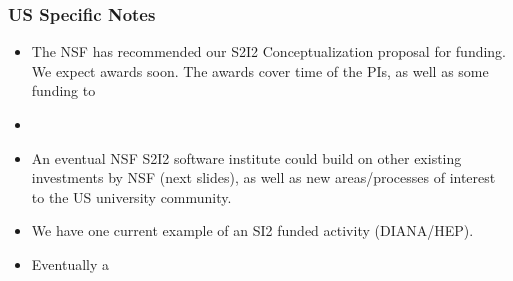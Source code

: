 \begin{frame}
\frametitle{US Specific Notes}

\begin{itemize}
\item The NSF has recommended our S2I2 Conceptualization proposal for funding. We expect awards soon. The awards cover time of the PIs, as well as some funding to 
\item 
\item An eventual NSF S2I2 software institute could build on other existing investments by NSF (next slides), as well as new areas/processes of interest to the US university community.
\item We have one current example of an SI2 funded activity (DIANA/HEP). 
\item Eventually a
\end{itemize}

\end{frame}


